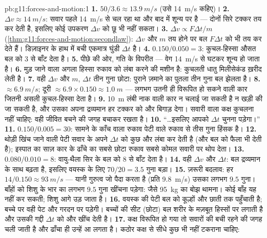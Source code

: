 \begin{solution}{pb:g11:forces-and-motion:1}
\textbf{1.} $50/3.6 \approx \qty{13.9}{m/s}$ (उसे \qty{14}{m/s} कहिए)।
\textbf{2.} $\Delta v \approx \qty{14}{m/s}$: सवार पहले \qty{14}{m/s} से चल रहा था और बाद में शून्य पर है ---
दोनों सिरे टक्कर तय कर देती है, इसलिए कोई उपकरण $\Delta v$ को छू भी नहीं सकता।
\textbf{3.} $\Delta v \propto F\Delta t/m$ (\cref{thm:g11:forces-and-motion:secondlaw}): $\Delta v$ और $m$ तय होने पर बल $F\Delta t$
को भी तय कर देते हैं। डिज़ाइनर के हाथ में बची एकमात्र घुंडी $\Delta t$ है।
\textbf{4.} $0.150/0.050 = 3$: कुचल-हिस्सा औसत बल को $3$ से बाँट देता है।
\textbf{5.} पीछे की ओर, गति के विपरीत --- वेग \qty{14}{m/s} से घटकर शून्य हो जाता
है।
\textbf{6.} मुड़ जाने वाला अगला हिस्सा रुकाव को लंबा करने की मशीन है: कुचलती
धातु मिलीसेकंड ख़रीद लेती है।
\textbf{7.} वही $\Delta v$ और $m$, $\Delta t$ तीन गुना छोटा: पुराने ज़माने का
पुतला तीन गुना बल झेलता है।
\textbf{8.}  $\approx \qty{6.9}{m/s}$; दूरी $\approx
6.9 \times 0.150 \approx \qty{1.0}{m}$ --- लगभग उतनी ही
 विरूपित हो सकने वाली कार जितनी असली कुचल-हिस्सा देता है।
\textbf{9.} \qty{10}{m} लंबी नाक वाली कार न चलाई जा सकती है न खड़ी की जा सकती है,
और उसका अपना द्रव्यमान हर टक्कर को और बिगाड़ देगा। सवारी वाला कक्ष कुचलना
नहीं चाहिए: वही जीवित बचने की जगह बचाकर रखता है।
\textbf{10.} ``\dots इसलिए आपको $\Delta t$ चुनना पड़ेगा।''
\textbf{11.} $0.150/0.005 = 30$: सामने के काँच वाला रुकाव पेटी वाले रुकाव से तीस गुना
हिंसक है।
\textbf{12.} थोड़ी खिंच जाने वाली पेटी सवार के अपने $\Delta t$ को कुछ और लंबा
कर देती है (और बल को फैला भी देती है); इस्पात का साज़ कार के ढाँचे
का सबसे छोटा रुकाव सबसे कोमल सवारी पर थोप देता।
\textbf{13.} $0.080/0.010 = 8$: वायु-थैला सिर के बल को $8$ से बाँट देता
है।
\textbf{14.} वही $\Delta v$ और $\Delta t$: बल द्रव्यमान के साथ बढ़ता है,
इसलिए वयस्क के लिए $70/20 = 3.5$ गुना बड़ा।
\textbf{15.} ज़रूरी बदलाव: हर  $14/0.150 \approx \qty{93}{m/s}$ --- यानी गुरुत्व जो पैदा करता है
(प्रति  \qty{9.8}{m/s}) उसका लगभग $9.5$ गुना। बाँहों को शिशु के भार
का लगभग $9.5$ गुना खींचना पड़ेगा: जैसे \qty{95}{kg} का बोझ थामना। कोई बाँह यह
नहीं कर सकती; शिशु आगे उड़ जाता है।
\textbf{16.} वयस्क की पेटी बल को कूल्हों और छाती तक पहुँचाती है;
बच्चे पर वही पेट और गरदन पर पड़ेगी। बच्चों की सीट (छोटा) बल शरीर के
मज़बूत हिस्सों पर लगाती है और उसकी गद्दी $\Delta t$ को और खींच देती है।
\textbf{17.} कक्ष विरूपित हो गया तो सवारों की बची रहने की जगह चली जाती है और
ढाँचा ही उन्हें आ लगता है। कठोर कक्ष से सीधे कुछ भी नहीं टकराना चाहिए:

\end{solution}
